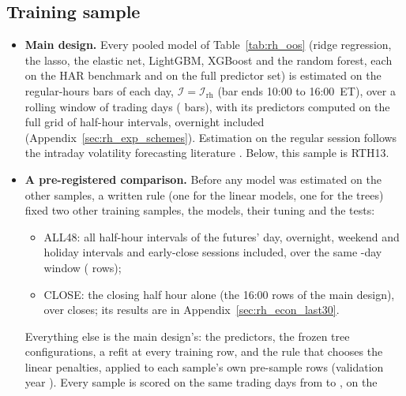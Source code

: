 \subsection{Training sample}
\label{app:rh_robust_train}
\begin{itemize}
\item \textbf{Main design.} Every pooled model of Table~\ref{tab:rh_oos} (ridge regression, the lasso, the elastic
  net, LightGBM, XGBoost and the random forest, each on the HAR benchmark and on the full predictor set) is estimated
  on the \rhtaNBarsDay{} regular-hours bars of each day, $\mathcal I = \mathcal I_{\mathrm{rh}}$ (bar ends 10:00 to
  16:00~ET), over a rolling window of \rhtaWinDays{} trading days (\rhtaRowsRth{} bars), with its predictors
  computed on the full grid of \rhtaNIntervals{} half-hour intervals, overnight included
  (Appendix~\ref{sec:rh_exp_schemes}). Estimation on the regular session follows the intraday volatility
  forecasting literature \citep{EngleSokalska2012,ZhangZhangCucuringuQian2024}. Below, this sample is RTH13.
\item \textbf{A pre-registered comparison.} Before any model was estimated on the other samples, a written rule (one
  for the linear models, one for the trees) fixed two other training samples, the models, their tuning and the tests:
  \begin{itemize}
  \item ALL48: all \rhtaNIntervals{} half-hour intervals of the futures' day, overnight, weekend and holiday
    intervals and early-close sessions included, over the same \rhtaWinDays-day window (\rhtaRowsAll{} rows);
  \item CLOSE: the closing half hour alone (the 16:00 rows of the main design), over \rhtaRowsCl{} closes; its
    results are in Appendix~\ref{sec:rh_econ_last30}.
  \end{itemize}
  Everything else is the main design's: the predictors, the frozen tree configurations, a refit at every training
  row, and the rule that chooses the linear penalties, applied to each sample's own pre-sample rows (validation year
  \rhtaValYear). Every sample is scored on the same \rhtaNdays{} trading days from \rhtaStart{} to \rhtaEnd, on the

\end{itemize}
